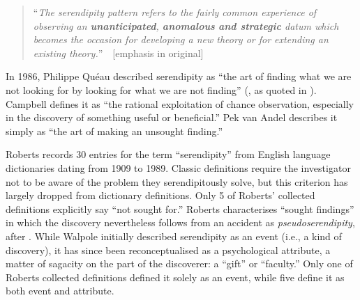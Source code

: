 \begin{quote}
``\emph{The serendipity pattern refers to the fairly common experience of observing an \emph{\textbf{unanticipated}}, \emph{\textbf{anomalous}} \emph{\textbf{and strategic}} datum which becomes the occasion for developing a new theory or for extending an existing theory.}''~\cite[p. 506]{merton1948bearing}~{[}emphasis in original{]}
\end{quote}

In 1986, Philippe Qu\'eau described serendipity as ``the art of
finding what we are not looking for by looking for what we are not
finding'' (, as quoted in
\cite[p. 121]{Campos2002}).  Campbell
\citeyear{campbell2005serendipity} defines it as ``the rational
exploitation of chance observation, especially in the discovery of
something useful or beneficial.''  Pek van Andel
\citeyear[p. 631]{van1994anatomy} describes it simply as ``the art of
making an unsought finding.''


Roberts \citeyear[pp. 246--249]{roberts} records 30 entries for the term ``serendipity'' from English language dictionaries dating from 1909 to 1989.  
%
Classic definitions require the investigator not to be aware of the problem they serendipitously solve, but this criterion has largely dropped from dictionary definitions. Only 5 of Roberts' collected definitions explicitly say ``not sought for.''  Roberts characterises ``sought findings'' in which the discovery nevertheless follows from an accident as \emph{pseudoserendipity}, after .
%
While Walpole initially described serendipity as an event
(i.e., a kind of discovery), it has
since been reconceptualised as a psychological attribute, a matter of
sagacity on the part of the discoverer: a ``gift'' or ``faculty.''
Only one of Roberts collected definitions defined it solely as an event, while five define it as both
event and attribute.

